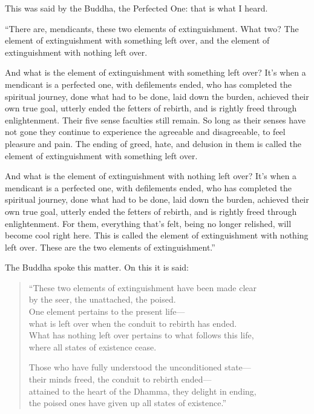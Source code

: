 \documentclass[12pt,openany]{book}%
\begin{document}
This was said by the Buddha, the Perfected One: that is what I heard. 

“There are, mendicants, these two elements of extinguishment. What two? The element of extinguishment with something left over, and the element of extinguishment with nothing left over. 

And what is the element of extinguishment with something left over? It’s when a mendicant is a perfected one, with defilements ended, who has completed the spiritual journey, done what had to be done, laid down the burden, achieved their own true goal, utterly ended the fetters of rebirth, and is rightly freed through enlightenment. Their five sense faculties still remain. So long as their senses have not gone they continue to experience the agreeable and disagreeable, to feel pleasure and pain. The ending of greed, hate, and delusion in them is called the element of extinguishment with something left over. 

And what is the element of extinguishment with nothing left over? It’s when a mendicant is a perfected one, with defilements ended, who has completed the spiritual journey, done what had to be done, laid down the burden, achieved their own true goal, utterly ended the fetters of rebirth, and is rightly freed through enlightenment. For them, everything that’s felt, being no longer relished, will become cool right here. This is called the element of extinguishment with nothing left over. These are the two elements of extinguishment.” 

The Buddha spoke this matter. On this it is said: 

\begin{verse}%
“These two elements of extinguishment have been made clear \\
by the seer, the unattached, the poised. \\
One element pertains to the present life—\\
what is left over when the conduit to rebirth has ended. \\
What has nothing left over pertains to what follows this life, \\
where all states of existence cease. 

Those who have fully understood the unconditioned state—\\
their minds freed, the conduit to rebirth ended—\\
attained to the heart of the Dhamma, they delight in ending, \\
the poised ones have given up all states of existence.” 

%
\end{verse}
\end{document}
